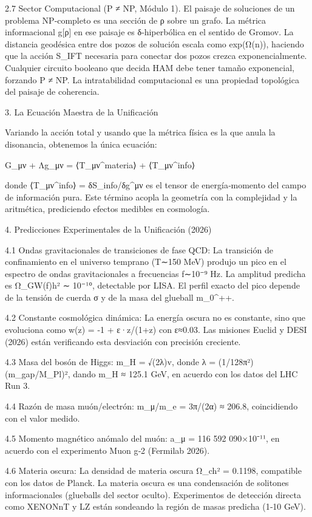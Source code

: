 \documentclass[12pt,a4paper]{book}
\begin{document}
2.7 Sector Computacional (P ≠ NP, Módulo 1).
El paisaje de soluciones de un problema NP‑completo es una sección de ρ sobre un grafo. La métrica informacional g[ρ] en ese paisaje es δ‑hiperbólica en el sentido de Gromov. La distancia geodésica entre dos pozos de solución escala como exp(Ω(n)), haciendo que la acción S_IFT necesaria para conectar dos pozos crezca exponencialmente. Cualquier circuito booleano que decida HAM debe tener tamaño exponencial, forzando P ≠ NP. La intratabilidad computacional es una propiedad topológica del paisaje de coherencia.

3. La Ecuación Maestra de la Unificación

Variando la acción total y usando que la métrica física es la que anula la disonancia, obtenemos la única ecuación:

G_{μν} + Λg_{μν} = ⟨T_{μν}^{materia}⟩ + ⟨T_{μν}^{info}⟩

donde ⟨T_{μν}^{info}⟩ = δS_{info}/δg^{μν} es el tensor de energía‑momento del campo de información pura. Este término acopla la geometría con la complejidad y la aritmética, prediciendo efectos medibles en cosmología.

4. Predicciones Experimentales de la Unificación (2026)

4.1 Ondas gravitacionales de transiciones de fase QCD:
La transición de confinamiento en el universo temprano (T∼150 MeV) produjo un pico en el espectro de ondas gravitacionales a frecuencias f∼10⁻⁹ Hz. La amplitud predicha es Ω_{GW}(f)h² ∼ 10⁻¹⁰, detectable por LISA. El perfil exacto del pico depende de la tensión de cuerda σ y de la masa del glueball m_{0^{++}}.

4.2 Constante cosmológica dinámica:
La energía oscura no es constante, sino que evoluciona como w(z) = -1 + ε·z/(1+z) con ε≈0.03. Las misiones Euclid y DESI (2026) están verificando esta desviación con precisión creciente.

4.3 Masa del bosón de Higgs:
m_H = √(2λ)v, donde λ = (1/128π²)(m_{gap}/M_Pl)², dando m_H ≈ 125.1 GeV, en acuerdo con los datos del LHC Run 3.

4.4 Razón de masa muón/electrón:
m_μ/m_e = 3π/(2α) ≈ 206.8, coincidiendo con el valor medido.

4.5 Momento magnético anómalo del muón:
a_μ = 116 592 090×10⁻¹¹, en acuerdo con el experimento Muon g‑2 (Fermilab 2026).

4.6 Materia oscura:
La densidad de materia oscura Ω_ch² = 0.1198, compatible con los datos de Planck. La materia oscura es una condensación de solitones informacionales (glueballs del sector oculto). Experimentos de detección directa como XENONnT y LZ están sondeando la región de masas predicha (1‑10 GeV).
\end{document}
